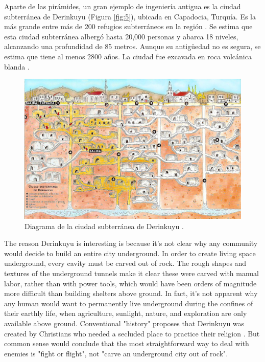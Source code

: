 \documentclass[10pt,twocolumn,letterpaper]{article}
\begin{document}
Aparte de las pirámides, un gran ejemplo de ingeniería antigua es la ciudad subterránea de Derinkuyu (Figura \ref{fig:5}), ubicada en Capadocia, Turquía. Es la más grande entre más de 200 refugios subterráneos en la región \cite{54}. Se estima que esta ciudad subterránea albergó hasta 20,000 personas y abarca 18 niveles, alcanzando una profundidad de 85 metros. Aunque su antigüedad no es segura, se estima que tiene al menos 2800 años. La ciudad fue excavada en roca volcánica blanda \cite{52, 53}.

\begin{figure}[b]
\begin{center}
   \includegraphics[width=1\linewidth]{derinkuyu.jpeg}
\end{center}
   \caption{Diagrama de la ciudad subterránea de Derinkuyu \cite{56}.}
\label{fig:5}
\label{fig:onecol}
\end{figure}
The reason Derinkuyu is interesting is because it's not clear why any community would decide to build an entire city underground. In order to create living space underground, every cavity must be carved out of rock. The rough shapes and textures of the underground tunnels make it clear these were carved with manual labor, rather than with power tools, which would have been orders of magnitude more difficult than building shelters above ground. In fact, it's not apparent why any human would want to permanently live underground during the confines of their earthly life, when agriculture, sunlight, nature, and exploration are only available above ground. Conventional "history" proposes that Derinkuyu was created by Christians who needed a secluded place to practice their religion \cite{53}. But common sense would conclude that the most straightforward way to deal with enemies is "fight or flight", not "carve an underground city out of rock".
\end{document}
